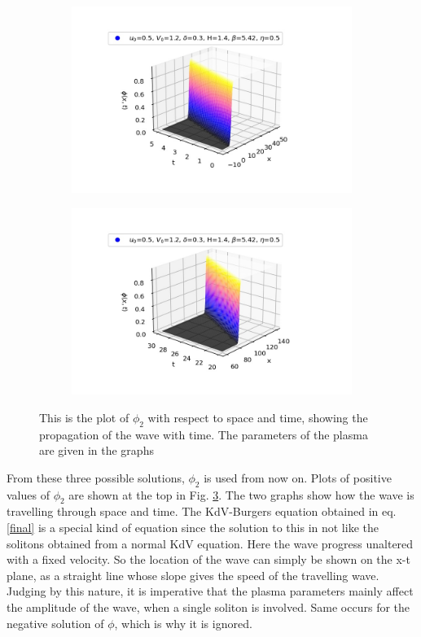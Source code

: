 \documentclass[a4paper, 12pt]{article}
\begin{document}
\begin{figure}[t]
\begin{subfigure}{0.5\textwidth}
\centering
\includegraphics[scale=0.7]{tanh_t0--5.jpg}
\label{fig1}
\end{subfigure}
\begin{subfigure}{0.5\textwidth}
\centering
\includegraphics[scale=0.7]{tanh_t20--30.jpg}
\label{fig2}
\end{subfigure}
\caption{This is the plot of $\phi_2$ with respect to space and time, showing the propagation of the wave with time. The parameters of the plasma are given in the graphs}
\label{tanh}
\end{figure}
From these three possible solutions, $\phi_2$ is used from now on. Plots of positive values of $\phi_2$ are shown at the top in Fig. \ref{tanh}. The two graphs show how the wave is travelling through space and time. The KdV-Burgers equation obtained in eq.\eqref{final} is a special kind of equation since the solution to this in not like the solitons obtained from a normal KdV equation. Here the wave progress unaltered with a fixed velocity. So the location of the wave can simply be shown on the x-t plane, as a straight line whose slope gives the speed of the travelling wave. Judging by this nature, it is imperative that the plasma parameters mainly affect the amplitude of the wave, when a single soliton is involved. Same occurs for the negative solution of $\phi$, which is why it is ignored.
\end{document}
